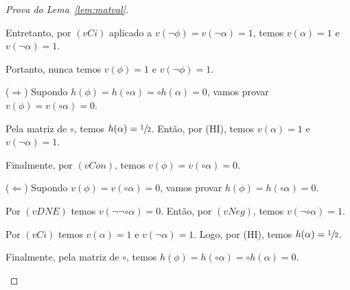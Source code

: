 \begin{proof}[Prova do Lema~\ref{lem:matval}]
\begin{provaporcasos}
\begin{provaporsubcasos}
                        Entretanto, por $(vCi)$ aplicado a $v(\neg \phi) = v(\neg \alpha) = 1$, temos $v(\alpha) = 1$ e $v(\neg \alpha) = 1$.

                        Portanto, nunca temos $v(\phi) = 1$ e $v(\neg \phi) = 1$.

                        
                    

                        ($\Longrightarrow$) Supondo $h(\phi) = h(\circ \alpha) = \circ h(\alpha) = 0$, vamos provar $v(\phi) = v(\circ \alpha) = 0$.

                        Pela matriz de $\circ$, temos $h(\alpha) = \sfrac{1}{2}{}$. Então, por (HI), temos $v(\alpha) = 1$ e $v(\neg \alpha) = 1$. 
                        
                        Finalmente, por $(vCon)$, temos $v(\phi) = v(\circ \alpha) = 0$.
                    
                        ($\Longleftarrow$) Supondo $v(\phi) = v(\circ \alpha) = 0$, vamos provar $h(\phi) = h(\circ \alpha) = 0$.

                        Por $(vDNE)$ temos $v(\neg \neg \circ \alpha) = 0$. Então, por $(vNeg)$, temos $v(\neg \circ \alpha) = 1$.

                        Por $(vCi)$ temos $v(\alpha) = 1$ e $v(\neg \alpha) = 1$. Logo, por (HI), temos $h(\alpha) = \sfrac{1}{2}{}$.

                        Finalmente, pela matriz de $\circ$, temos $h(\phi) = h(\circ \alpha) = \circ h(\alpha) = 0$.
                    
            \end{provaporsubcasos}
        


            \begin{provaporsubcasos}


\end{provaporsubcasos}
\end{provaporcasos}
\end{proof}
